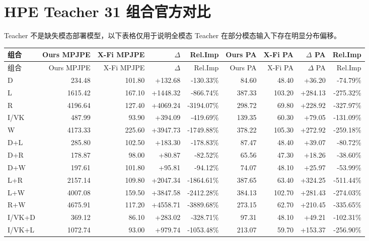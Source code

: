 \documentclass[UTF8,10pt,a4paper]{ctexart}
\newcommand{\worse}[1]{\textcolor{DropRed}{#1}}
\begin{document}
\section{HPE Teacher 31 组合官方对比}
{\tiny
Teacher 不是缺失模态部署模型，以下表格仅用于说明全模态 Teacher 在部分模态输入下存在明显分布偏移。
\begin{longtable}{lrrrrrrrr}
\toprule
组合 & Ours MPJPE & X-Fi MPJPE & $\Delta$ & Rel.Imp & Ours PA & X-Fi PA & $\Delta$ PA & Rel.Imp\\
\midrule
\endfirsthead
\toprule
组合 & Ours MPJPE & X-Fi MPJPE & $\Delta$ & Rel.Imp & Ours PA & X-Fi PA & $\Delta$ PA & Rel.Imp\\
\midrule
\endhead
D & 234.48 & 101.80 & \worse{+132.68} & \worse{-130.33\%} & 84.60 & 48.40 & \worse{+36.20} & \worse{-74.79\%}\\
L & 1615.42 & 167.10 & \worse{+1448.32} & \worse{-866.74\%} & 387.33 & 103.20 & \worse{+284.13} & \worse{-275.32\%}\\
R & 4196.64 & 127.40 & \worse{+4069.24} & \worse{-3194.07\%} & 298.72 & 69.80 & \worse{+228.92} & \worse{-327.97\%}\\
I/VK & 487.99 & 93.90 & \worse{+394.09} & \worse{-419.69\%} & 139.35 & 60.30 & \worse{+79.05} & \worse{-131.09\%}\\
W & 4173.33 & 225.60 & \worse{+3947.73} & \worse{-1749.88\%} & 378.22 & 105.30 & \worse{+272.92} & \worse{-259.18\%}\\
D+L & 285.80 & 102.50 & \worse{+183.30} & \worse{-178.83\%} & 87.47 & 48.40 & \worse{+39.07} & \worse{-80.72\%}\\
D+R & 178.87 & 98.00 & \worse{+80.87} & \worse{-82.52\%} & 65.56 & 47.30 & \worse{+18.26} & \worse{-38.60\%}\\
D+W & 197.61 & 101.80 & \worse{+95.81} & \worse{-94.12\%} & 74.07 & 48.10 & \worse{+25.97} & \worse{-53.99\%}\\
L+R & 2157.14 & 109.80 & \worse{+2047.34} & \worse{-1864.61\%} & 387.65 & 63.40 & \worse{+324.25} & \worse{-511.44\%}\\
L+W & 4007.08 & 159.50 & \worse{+3847.58} & \worse{-2412.28\%} & 384.13 & 102.70 & \worse{+281.43} & \worse{-274.03\%}\\
R+W & 4675.91 & 117.20 & \worse{+4558.71} & \worse{-3889.68\%} & 273.15 & 62.70 & \worse{+210.45} & \worse{-335.65\%}\\
I/VK+D & 369.12 & 86.10 & \worse{+283.02} & \worse{-328.71\%} & 97.31 & 48.10 & \worse{+49.21} & \worse{-102.31\%}\\
I/VK+L & 1072.74 & 93.00 & \worse{+979.74} & \worse{-1053.48\%} & 213.07 & 59.70 & \worse{+153.37} & \worse{-256.90\%}\\

\end{longtable}}
\end{document}
